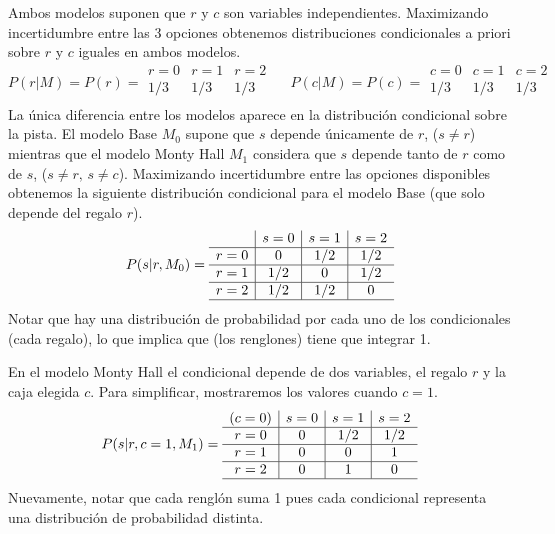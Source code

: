 \documentclass[a4paper,10pt]{article}
\begin{document}
Ambos modelos suponen que $r$ y $c$ son variables independientes.
%
Maximizando incertidumbre entre las 3 opciones obtenemos distribuciones condicionales a priori sobre $r$ y $c$ iguales en ambos modelos.
$$
P(r|M) = P(r) = \begin{array}{c|c|c}
  r=0 & r=1 & r=2 \\
  \hline
  1/3 & 1/3 & 1/3 \\
\end{array}
\ \ \ \ \ \
P(c|M) = P(c) = \begin{array}{c|c|c}
  c=0 & c=1 & c=2 \\
  \hline
  1/3 & 1/3 & 1/3 \\
\end{array}
$$
La única diferencia entre los modelos aparece en la distribución condicional sobre la pista.
El modelo Base $M_0$ supone que $s$ depende únicamente de $r$, ($s\neq r$) mientras que el modelo Monty Hall $M_1$ considera que $s$ depende tanto de $r$ como de $s$, ($s\neq r, \, s\neq c$).
Maximizando incertidumbre entre las opciones disponibles obtenemos la siguiente distribución condicional para el modelo Base (que solo depende del regalo $r$).
$$
P(s|r,M_0) = \begin{array}{c|c|c|c}
  & s=0 & s=1 & s=2 \\ \hline
 r=0 & 0 & 1/2 & 1/2 \\ \hline
 r=1 & 1/2 & 0 & 1/2 \\ \hline
 r=2 & 1/2 & 1/2 & 0 \\ \hline
\end{array}
$$
Notar que hay una distribución de probabilidad por cada uno de los condicionales (cada regalo), lo que implica que (los renglones) tiene que integrar 1.


En el modelo Monty Hall el condicional depende de dos variables, el regalo $r$ y la caja elegida $c$.
Para simplificar, mostraremos los valores cuando $c=1$.
$$
P(s|r,c=1,M_1) = \begin{array}{c|c|c|c}
 (c=0) & s=0 & s=1 & s=2 \\ \hline
 r=0 & 0 & 1/2 & 1/2 \\ \hline
 r=1 & 0 & 0 & 1 \\ \hline
 r=2 & 0 & 1 & 0 \\ \hline
\end{array}
$$
Nuevamente, notar que cada renglón suma 1 pues cada condicional representa una distribución de probabilidad distinta.

\end{document}
